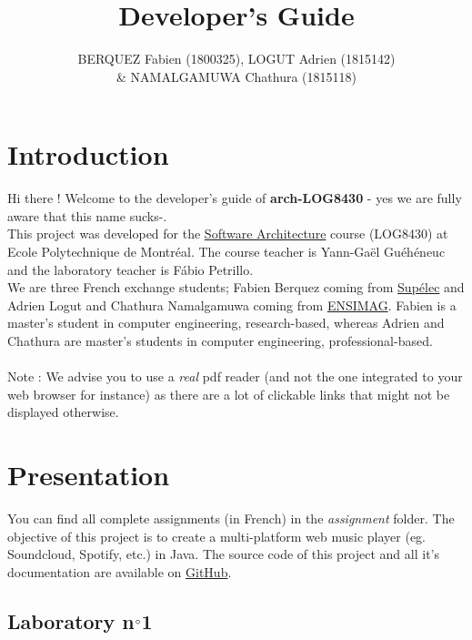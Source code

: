 \documentclass{report}
\title{Developer's Guide}
\author{BERQUEZ Fabien  (1800325), LOGUT Adrien (1815142) \\ \& NAMALGAMUWA Chathura (1815118)}
\date{}
\begin{document}
\maketitle

\tableofcontents

\newtoggle{diag}

\toggletrue{diag}

\chapter{Introduction}

Hi there ! Welcome to the developer's guide of \textbf{arch-LOG8430} - yes we are fully aware that this name sucks-. \\

This project was developed for the \href{http://www.polymtl.ca/etudes/cours/details.php?sigle=LOG8430}{Software Architecture} course (LOG8430) at Ecole Polytechnique de Montréal. The course teacher is Yann-Gaël Guéhéneuc and the laboratory teacher is Fábio Petrillo. \\

We are three French exchange students; Fabien Berquez coming from \href{http://www.supelec.fr/374_p_14603/welcome.html}{Supélec} and Adrien Logut and Chathura Namalgamuwa coming from \href{http://ensimag.grenoble-inp.fr/welcome/}{ENSIMAG}. Fabien is a master's student in computer engineering, research-based, whereas Adrien and Chathura are master's students in computer engineering, professional-based. \\ 

\ \\

Note : We advise you to use a \textit{real} pdf reader (and not the one integrated to your web browser for instance) as there are a lot of clickable links that might not be displayed otherwise.
\chapter{Presentation}

You can find all complete assignments (in French) in the \textit{assignment} folder. The objective of this project is to create a multi-platform web music player (eg. Soundcloud, Spotify, etc.) in Java. The source code of this project and all it's documentation are available on \href{https://github.com/cnamal/arch-LOG8430}{GitHub}.

\section{Laboratory n$\degree$1}
\end{document}
